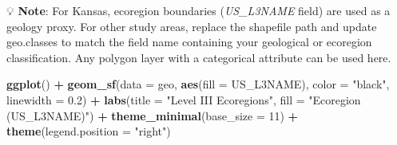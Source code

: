 \documentclass[
  10pt,
  b5paper,
  oneside]{book}
\newenvironment{Shaded}{\begin{snugshade}}{\end{snugshade}}
\newcommand{\AttributeTok}[1]{\textcolor[rgb]{0.13,0.29,0.53}{#1}}
\newcommand{\CommentTok}[1]{\textcolor[rgb]{0.56,0.35,0.01}{\textit{#1}}}
\newcommand{\ConstantTok}[1]{\textcolor[rgb]{0.56,0.35,0.01}{#1}}
\newcommand{\ControlFlowTok}[1]{\textcolor[rgb]{0.13,0.29,0.53}{\textbf{#1}}}
\newcommand{\DecValTok}[1]{\textcolor[rgb]{0.00,0.00,0.81}{#1}}
\newcommand{\FloatTok}[1]{\textcolor[rgb]{0.00,0.00,0.81}{#1}}
\newcommand{\FunctionTok}[1]{\textcolor[rgb]{0.13,0.29,0.53}{\textbf{#1}}}
\newcommand{\NormalTok}[1]{#1}
\newcommand{\OtherTok}[1]{\textcolor[rgb]{0.56,0.35,0.01}{#1}}
\newcommand{\SpecialCharTok}[1]{\textcolor[rgb]{0.81,0.36,0.00}{\textbf{#1}}}
\newcommand{\StringTok}[1]{\textcolor[rgb]{0.31,0.60,0.02}{#1}}
\begin{document}
💡 \textbf{Note}: For Kansas, ecoregion boundaries (\emph{US\_L3NAME} field) are used as a geology proxy. For other study areas, replace the shapefile path and update geo.classes to match the field name containing your geological or ecoregion classification. Any polygon layer with a categorical attribute can be used here.

\begin{Shaded}
\end{Shaded}

\begin{Shaded}
\begin{Highlighting}[]
\FunctionTok{ggplot}\NormalTok{() }\SpecialCharTok{+}
  \FunctionTok{geom\_sf}\NormalTok{(}\AttributeTok{data =}\NormalTok{ geo, }\FunctionTok{aes}\NormalTok{(}\AttributeTok{fill =}\NormalTok{ US\_L3NAME), }\AttributeTok{color =} \StringTok{"black"}\NormalTok{, }\AttributeTok{linewidth =} \FloatTok{0.2}\NormalTok{) }\SpecialCharTok{+}
  \FunctionTok{labs}\NormalTok{(}\AttributeTok{title =} \StringTok{"Level III Ecoregions"}\NormalTok{,}
       \AttributeTok{fill =} \StringTok{"Ecoregion (US\_L3NAME)"}\NormalTok{) }\SpecialCharTok{+}
  \FunctionTok{theme\_minimal}\NormalTok{(}\AttributeTok{base\_size =} \DecValTok{11}\NormalTok{) }\SpecialCharTok{+}
  \FunctionTok{theme}\NormalTok{(}\AttributeTok{legend.position =} \StringTok{"right"}\NormalTok{)}
\end{Highlighting}
\end{Shaded}
\end{document}
